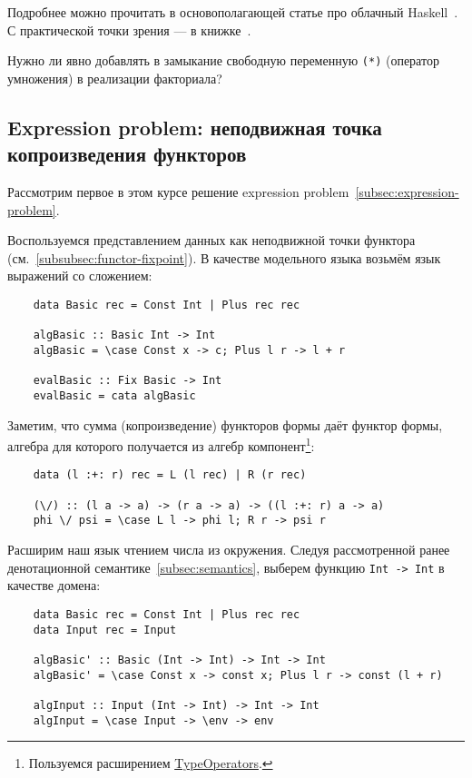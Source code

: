 Подробнее можно прочитать в основополагающей статье про облачный Haskell~\cite{epstein2011towards}.
С практической точки зрения --- в книжке~\cite[глава 16]{marlow2011parallel}.

\begin{task}
    Нужно ли явно добавлять в замыкание свободную переменную \texttt{(*)} (оператор умножения) в реализации факториала?
\end{task}

\subsection{Expression problem: неподвижная точка копроизведения функторов} \label{subsec:functor-coprod}

Рассмотрим первое в этом курсе решение expression problem~\ref{subsec:expression-problem}.

Воспользуемся представлением данных как неподвижной точки функтора (см.~\ref{subsubsec:functor-fixpoint}).
В качестве модельного языка возьмём язык выражений со сложением:
\begin{verbatim}
    data Basic rec = Const Int | Plus rec rec

    algBasic :: Basic Int -> Int
    algBasic = \case Const x -> c; Plus l r -> l + r

    evalBasic :: Fix Basic -> Int
    evalBasic = cata algBasic
\end{verbatim}

Заметим, что сумма (копроизведение) функторов формы даёт функтор формы, алгебра для которого получается из алгебр компонент\footnote{Пользуемся расширением \href{https://ghc.gitlab.haskell.org/ghc/doc/users_guide/exts/type_operators.html}{TypeOperators}.}:
\begin{verbatim}
    data (l :+: r) rec = L (l rec) | R (r rec)

    (\/) :: (l a -> a) -> (r a -> a) -> ((l :+: r) a -> a)
    phi \/ psi = \case L l -> phi l; R r -> psi r
\end{verbatim}

Расширим наш язык чтением числа из окружения.
Следуя рассмотренной ранее денотационной семантике~\ref{subsec:semantics}, выберем функцию \texttt{Int -> Int} в качестве домена:
\begin{verbatim}
    data Basic rec = Const Int | Plus rec rec
    data Input rec = Input

    algBasic' :: Basic (Int -> Int) -> Int -> Int
    algBasic' = \case Const x -> const x; Plus l r -> const (l + r)

    algInput :: Input (Int -> Int) -> Int -> Int
    algInput = \case Input -> \env -> env
\end{verbatim}

